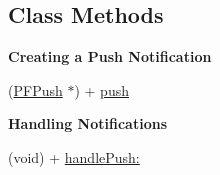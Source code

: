\subsection*{Class Methods}
\begin{Indent}{\bf Creating a Push Notification}\par
{\em 

 

 }\begin{DoxyCompactItemize}
\item 
(\hyperlink{interface_p_f_push}{P\+F\+Push} $\ast$) + \hyperlink{interface_p_f_push_a256acbba3e87a69f5f4fa5ca760f35ac}{push}
\end{DoxyCompactItemize}
\end{Indent}
\begin{Indent}{\bf Handling Notifications}\par
{\em 

 

 }\begin{DoxyCompactItemize}
\item 
(void) + \hyperlink{interface_p_f_push_ad9cd495c20065b7dd33e57f60d3f5516}{handle\+Push\+:}
\end{DoxyCompactItemize}
\end{Indent}
